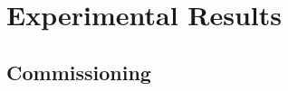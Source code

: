 \chapter{Experimental Results}
\label{chap:results}

\setcounter{section}{0}
\setcounter{subsection}{0}

\label{sec:performance}

\FloatBarrier  %

% 



\section{Commissioning}


\vspace{5\baselineskip}
